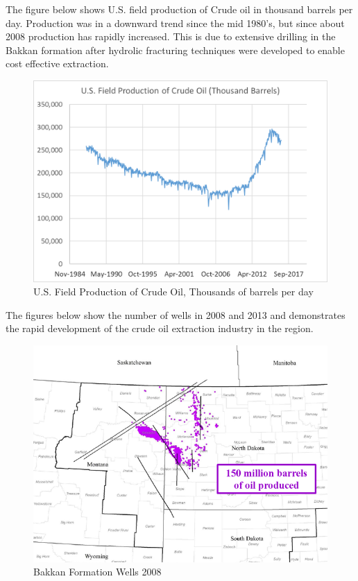 \documentclass[]{book}
\theoremstyle{definition}
\theoremstyle{definition}
\theoremstyle{remark}
\begin{document}
The figure below shows U.S. field production of Crude oil in thousand
barrels per day. Production was in a downward trend since the mid
1980's, but since about 2008 production has rapidly increased. This is
due to extensive drilling in the Bakkan formation after hydrolic
fracturing techniques were developed to enable cost effective
extraction.

\begin{figure}[htbp]
\centering
\includegraphics{Excel-files/CrudeOiland-crudeoil_files/image004.png}
\caption{U.S. Field Production of Crude Oil, Thousands of barrels per
day}
\end{figure}

The figures below show the number of wells in 2008 and 2013 and
demonstrates the rapid development of the crude oil extraction industry
in the region.

\begin{figure}[htbp]
\centering
\includegraphics{images/640px-Bakken_Wells_2008.png}
\caption{Bakkan Formation Wells 2008}
\end{figure}
\end{document}

